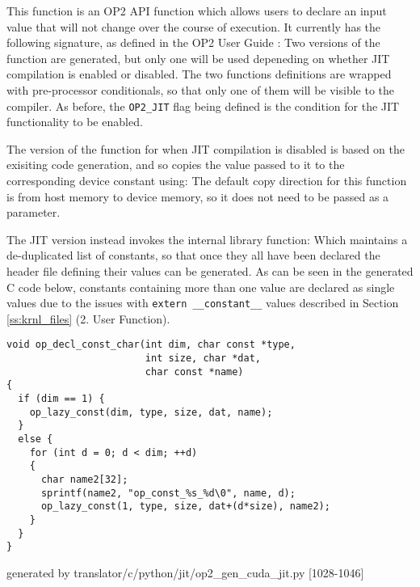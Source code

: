 This function is an OP2 API function which allows users to declare an input value that will not change over the course of execution. It currently has the following signature, as defined in the OP2 User Guide \cite[p9]{manual}:
 Two versions of the function are generated, but only one will be used depeneding on whether JIT compilation is enabled or disabled. The two functions definitions are wrapped with pre-processor conditionals, so that only one of them will be visible to the compiler. As before, the \verb|OP2_JIT| flag being defined is the condition for the JIT functionality to be enabled.


\par
The version of the function for when JIT compilation is disabled is based on the exisiting code generation, and so copies the value passed to it to the corresponding device constant using:
\noindent The default copy direction for this function is from host memory to device memory, so it does not need to be passed as a parameter.
\par
The JIT version instead invokes the internal library function:
Which maintains a de-duplicated list of constants, so that once they all have been declared the header file defining their values can be generated. As can be seen in the generated C code below, constants containing more than one value are declared as single values due to the issues with \verb|extern __constant__| values described in Section \ref{ss:krnl_files} (2. User Function).
\begin{lstlisting}[linewidth = \textwidth, framesep=0pt]
void op_decl_const_char(int dim, char const *type,
                        int size, char *dat,
                        char const *name)
{
  if (dim == 1) {
    op_lazy_const(dim, type, size, dat, name);
  }
  else {
    for (int d = 0; d < dim; ++d)
    {
      char name2[32];
      sprintf(name2, "op_const_%s_%d\0", name, d);
      op_lazy_const(1, type, size, dat+(d*size), name2);
    }
  }
}
\end{lstlisting}
\vspace{-1em}
\hspace*{\fill}\footnotesize{generated by translator/c/python/jit/op2\_gen\_cuda\_jit.py [1028-1046]}

